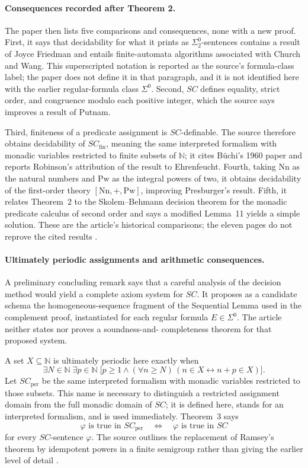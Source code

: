 \paragraph{Consequences recorded after Theorem 2.}
The paper then lists five comparisons and consequences, none with a new proof.
First, it says that decidability for what it prints as
\(\Sigma_2^0\)-sentences contains a result of Joyce Friedman and entails
finite-automata algorithms associated with Church and Wang.  This
superscripted notation is reported as the source's formula-class label; the
paper does not define it in that paragraph, and it is not identified here with
the earlier regular-formula class \(\Sigma^0\).  Second, \(SC\) defines
equality, strict order, and congruence modulo each positive integer, which the
source says improves a result of Putnam.

Third, finiteness of a predicate assignment is \(SC\)-definable.  The source
therefore obtains decidability of \(SC_{\mathrm{fin}}\), meaning the same
interpreted formalism with monadic variables restricted to finite subsets of
\(\mathbb N\); it cites B\"uchi's 1960 paper and reports Robinson's attribution
of the result to Ehrenfeucht.  Fourth, taking \(\mathrm{Nn}\) as the natural
numbers and \(\mathrm{Pw}\) as the integral powers of two, it obtains
decidability of the first-order theory
\([\mathrm{Nn},+,\mathrm{Pw}]\), improving Presburger's result.  Fifth, it
relates Theorem~2 to the Skolem--Behmann decision theorem for the monadic
predicate calculus of second order and says a modified Lemma~11 yields a simple
solution.  These are the article's historical comparisons; the eleven pages do
not reprove the cited results \cite[p.~9]{Buchi1962}.

\paragraph{Ultimately periodic assignments and arithmetic consequences.}
A preliminary concluding remark says that a careful analysis of the decision
method would yield a complete axiom system for \(SC\).  It proposes as a
candidate schema the homogeneous-sequence fragment of the Sequential Lemma
used in the complement proof, instantiated for each regular formula
\(E\in\Sigma^0\).  The article neither states nor proves a soundness-and-
completeness theorem for that proposed system.

A set \(X\subseteq\mathbb N\) is ultimately periodic here exactly when
\[
 \exists N\in\mathbb N\;\exists p\in\mathbb N\;
 \bigl[p\ge 1\land
 (\forall n\ge N)\,(n\in X\longleftrightarrow n+p\in X)\bigr].
\]
Let \(SC_{\mathrm{per}}\) be the same interpreted formalism with monadic
variables restricted to those subsets.  This name is necessary to distinguish
a restricted assignment domain from the full monadic domain of \(SC\); it is
defined here, stands for an interpreted formalism, and is used immediately.
Theorem~3 says
\[
 \varphi\text{ is true in }SC_{\mathrm{per}}
 \quad\Longleftrightarrow\quad
 \varphi\text{ is true in }SC
\]
for every \(SC\)-sentence \(\varphi\).  The source outlines the replacement of
Ramsey's theorem by idempotent powers in a finite semigroup rather than giving
the earlier level of detail \cite[pp.~9--10]{Buchi1962}.

